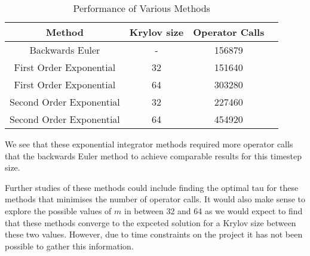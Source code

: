 \begin{table}[H]
    \centering
    \begin{tabular}{| c | c | c | c |}
    \hline
    Method & Krylov size & Operator Calls\\
    \hline
    Backwards Euler & - & 156879 \\
    First Order Exponential & 32 & 151640 \\
    First Order Exponential & 64 & 303280 \\
    Second Order Exponential & 32 & 227460 \\
    Second Order Exponential & 64 & 454920 \\
    \hline
    \end{tabular}
    \caption{Performance of Various Methods}
    \label{tab:reduced_data}
\end{table}

We see that these exponential integrator methods required more operator calls that the backwards Euler method to achieve comparable results for this timestep size.


Further studies of these methods could include finding the optimal tau for these methods that minimises the number of operator calls.
It would also make sense to explore the possible values of $m$ in between 32 and 64 as we would expect to find that these methods converge to the expceted solution for a Krylov size between these two values.
However, due to time constraints on the project it has not been possible to gather this information.

